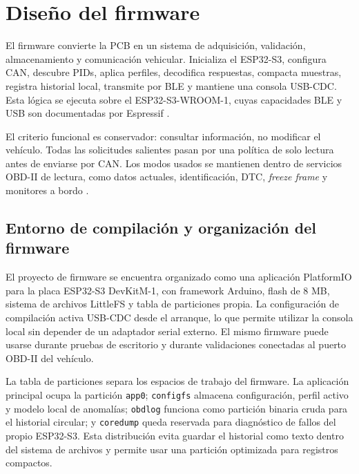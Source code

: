 \documentclass[12pt,letterpaper]{report}
\begin{document}
\section{Diseño del firmware}

El firmware convierte la PCB en un sistema de adquisición, validación, almacenamiento y comunicación vehicular. Inicializa el ESP32-S3, configura CAN, descubre PIDs, aplica perfiles, decodifica respuestas, compacta muestras, registra historial local, transmite por BLE y mantiene una consola USB-CDC. Esta lógica se ejecuta sobre el ESP32-S3-WROOM-1, cuyas capacidades BLE y USB son documentadas por Espressif \cite{espressif2026_esp32s3_get_started,espressif2026_esp32s3_ble_overview,espressif2026_esp32s3_usb_otg_console}.

El criterio funcional es conservador: consultar información, no modificar el vehículo. Todas las solicitudes salientes pasan por una política de solo lectura antes de enviarse por CAN. Los modos usados se mantienen dentro de servicios OBD-II de lectura, como datos actuales, identificación, DTC, \textit{freeze frame} y monitores a bordo \cite{sae2022_j1978_obdii_scan_tool,sae2025_j1979_diagnostic_test_modes}.

\subsection{Entorno de compilación y organización del firmware}

El proyecto de firmware se encuentra organizado como una aplicación PlatformIO para la placa ESP32-S3 DevKitM-1, con framework Arduino, flash de 8 MB, sistema de archivos LittleFS y tabla de particiones propia. La configuración de compilación activa USB-CDC desde el arranque, lo que permite utilizar la consola local sin depender de un adaptador serial externo. El mismo firmware puede usarse durante pruebas de escritorio y durante validaciones conectadas al puerto OBD-II del vehículo.

La tabla de particiones separa los espacios de trabajo del firmware. La aplicación principal ocupa la partición \texttt{app0}; \texttt{configfs} almacena configuración, perfil activo y modelo local de anomalías; \texttt{obdlog} funciona como partición binaria cruda para el historial circular; y \texttt{coredump} queda reservada para diagnóstico de fallos del propio ESP32-S3. Esta distribución evita guardar el historial como texto dentro del sistema de archivos y permite usar una partición optimizada para registros compactos.
\end{document}
